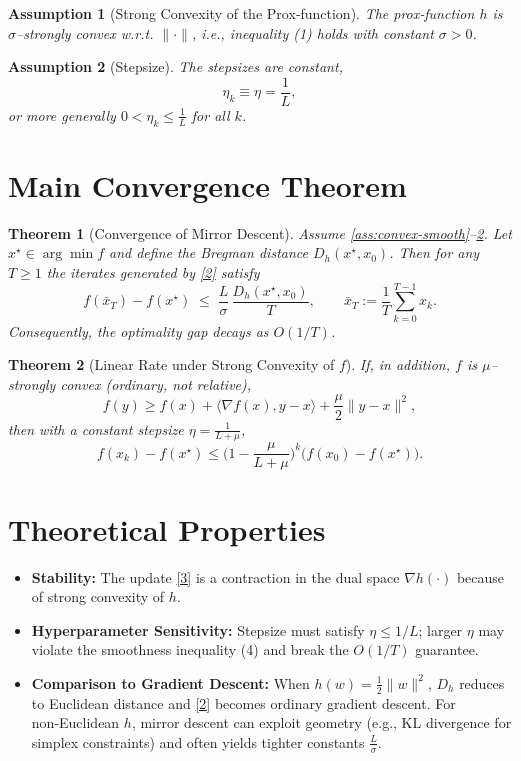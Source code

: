 \documentclass[11pt]{article}
\newtheorem{theorem}{Theorem}
\newtheorem{assumption}{Assumption}
\begin{document}
\begin{assumption}[Strong Convexity of the Prox‑function]
\label{ass:h-strong}
The prox‑function $h$ is $\sigma$–strongly convex w.r.t. $\|\cdot\|$,
i.e., inequality (1) holds with constant $\sigma>0$.
\end{assumption}

\begin{assumption}[Stepsize]
\label{ass:stepsize}
The stepsizes are constant,
\[
\eta_{k}\equiv\eta =\frac{1}{L},
\]
or more generally $0<\eta_{k}\le\frac{1}{L}$ for all $k$.
\end{assumption}

\section*{Main Convergence Theorem}
\begin{theorem}[Convergence of Mirror Descent]
\label{thm:md}
Assume \ref{ass:convex-smooth}–\ref{ass:stepsize}. Let $x^{\star}\in\arg\min f$
and define the Bregman distance $D_{h}(x^{\star},x_{0})$.
Then for any $T\ge1$ the iterates generated by \eqref{2} satisfy
\[
f(\bar x_{T})-f(x^{\star})
\;\le\;
\frac{L}{\sigma}\,\frac{D_{h}(x^{\star},x_{0})}{T},
\qquad
\bar x_{T}:=\frac{1}{T}\sum_{k=0}^{T-1}x_{k}.
\tag{5}
\]
Consequently, the optimality gap decays as $O(1/T)$.
\end{theorem}

\begin{theorem}[Linear Rate under Strong Convexity of $f$]
\label{thm:strong}
If, in addition, $f$ is $\mu$–strongly convex (ordinary, not relative),
\[
f(y)\ge f(x)+\langle\nabla f(x),y-x\rangle+\frac{\mu}{2}\|y-x\|^{2},
\]
then with a constant stepsize $\eta=\frac{1}{L+\mu}$,
\[
f(x_{k})-f(x^{\star})\le\Big(1-\frac{\mu}{L+\mu}\Big)^{k}
\big(f(x_{0})-f(x^{\star})\big).
\tag{6}
\]
\end{theorem}

\section*{Theoretical Properties}
\begin{itemize}
\item \textbf{Stability:} The update \eqref{3} is a contraction in the dual
space $\nabla h(\cdot)$ because of strong convexity of $h$.
\item \textbf{Hyperparameter Sensitivity:}
Stepsize must satisfy $\eta\le1/L$; larger $\eta$ may violate the
smoothness inequality (4) and break the $O(1/T)$ guarantee.
\item \textbf{Comparison to Gradient Descent:}
When $h(w)=\tfrac12\|w\|^{2}$, $D_{h}$ reduces to Euclidean distance and
\eqref{2} becomes ordinary gradient descent. For non‑Euclidean $h$,
mirror descent can exploit geometry (e.g., KL divergence for simplex
constraints) and often yields tighter constants $\frac{L}{\sigma}$.
\end{itemize}
\end{document}
